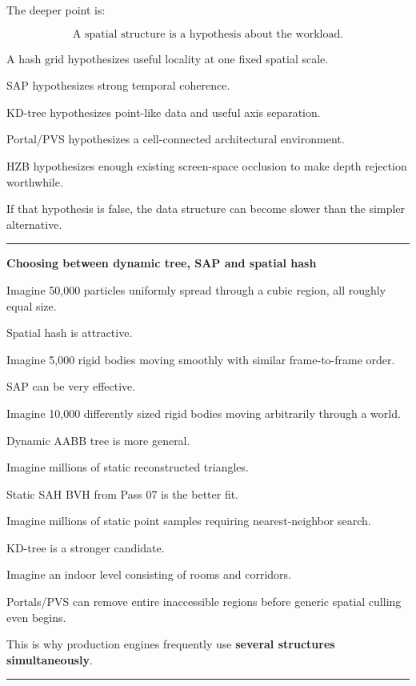 The deeper point is:

\[
\boxed{
\text{A spatial structure is a hypothesis about the workload.}
}
\]

A hash grid hypothesizes useful locality at one fixed spatial scale.

SAP hypothesizes strong temporal coherence.

KD-tree hypothesizes point-like data and useful axis separation.

Portal/PVS hypothesizes a cell-connected architectural environment.

HZB hypothesizes enough existing screen-space occlusion to make depth rejection worthwhile.

If that hypothesis is false, the data structure can become slower than the simpler alternative.

\begin{center}\rule{0.5\linewidth}{0.5pt}\end{center}

\textbf{Choosing between dynamic tree, SAP and spatial hash}

Imagine 50,000 particles uniformly spread through a cubic region, all roughly equal size.

Spatial hash is attractive.

Imagine 5,000 rigid bodies moving smoothly with similar frame-to-frame order.

SAP can be very effective.

Imagine 10,000 differently sized rigid bodies moving arbitrarily through a world.

Dynamic AABB tree is more general.

Imagine millions of static reconstructed triangles.

Static SAH BVH from Pass 07 is the better fit.

Imagine millions of static point samples requiring nearest-neighbor search.

KD-tree is a stronger candidate.

Imagine an indoor level consisting of rooms and corridors.

Portals/PVS can remove entire inaccessible regions before generic spatial culling even begins.

This is why production engines frequently use \textbf{several structures simultaneously}.

\begin{center}\rule{0.5\linewidth}{0.5pt}\end{center}

